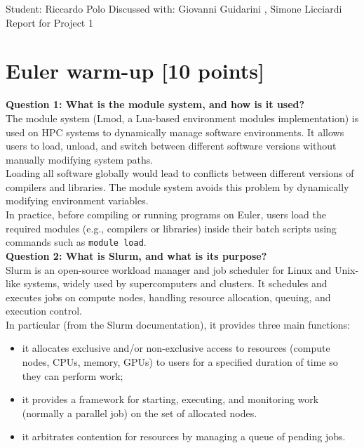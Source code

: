 \documentclass[unicode,10pt,a4paper,oneside,numbers=endperiod,openany]{scrartcl}
\begin{document}
\setassignment
{}

            {Student: Riccardo Polo}
            {Discussed with: Giovanni Guidarini , Simone Licciardi}
            {Report for Project 1}{}
\newline

\assignmentpolicy

\newpage
\section{Euler warm-up [10 points]}
\textbf{Question 1: What is the module system, and how is it used?}\\
The module system (Lmod, a Lua-based environment modules implementation) is used on HPC systems to dynamically manage software environments. It allows users to load, unload, and switch between different software versions without manually modifying system paths.\\
Loading all software globally would lead to conflicts between different versions of compilers and libraries. The module system avoids this problem by dynamically modifying environment variables.\\
In practice, before compiling or running programs on Euler, users load the required modules (e.g., compilers or libraries) inside their batch scripts using commands such as \texttt{module load}.\\

\textbf{Question 2: What is Slurm, and what is its purpose?} \\
Slurm is an open-source workload manager and job scheduler for Linux and Unix-like systems, widely used by supercomputers and clusters. It schedules and executes jobs on compute nodes, handling resource allocation, queuing, and execution control.\\
In particular (from the Slurm documentation), it provides three main functions:
\begin{itemize}
  \item it allocates exclusive and/or non-exclusive access to resources (compute nodes, CPUs, memory, GPUs) to users for a specified duration of time so they can perform work;
  \item it provides a framework for starting, executing, and monitoring work (normally a parallel job) on the set of allocated nodes.
  \item it arbitrates contention for resources by managing a queue of pending jobs.
\end{itemize}
\end{document}
